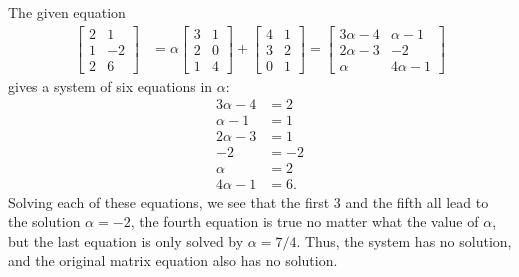 The given equation
\begin{align*}
\begin{bmatrix} 
2 & 1 \\ 
1 & -2 \\ 
2 & 6 
\end{bmatrix} 
&= 
\alpha\begin{bmatrix} 
3 & 1 \\ 
2 & 0 \\ 
1 & 4 
\end{bmatrix} 
+  
\begin{bmatrix} 
4 & 1 \\ 
3 & 2 \\ 
0 & 1
\end{bmatrix} 
= 
\begin{bmatrix} 
3\alpha - 4 & \alpha - 1 \\ 
2\alpha - 3 & -2 \\ 
\alpha & 4\alpha - 1 
\end{bmatrix}
\end{align*}
%
gives a system of six equations in $\alpha$:
%
\begin{align*}
3\alpha - 4 &= 2\\
\alpha - 1 &= 1 \\
2\alpha - 3&= 1\\
-2 &= -2\\
\alpha  &= 2\\
4\alpha - 1 &= 6.
\end{align*}
%
Solving each of these equations, we see that the first 3 and the fifth all lead to the solution $\alpha = -2$, the fourth equation is true no matter what the value of $\alpha$, but the last equation is only solved by $\alpha = 7/4$.  Thus, the system has no solution, and the original matrix equation also has no solution.
